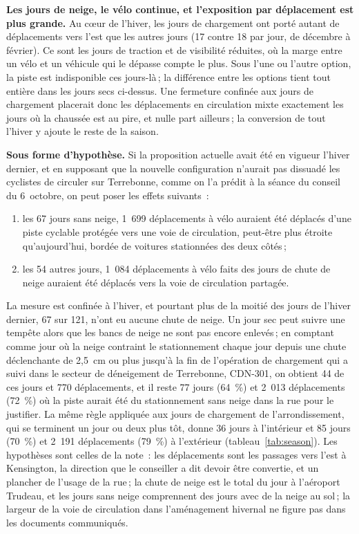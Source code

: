 \documentclass[11pt,letterpaper]{article}
\begin{document}
\textbf{Les jours de neige, le vélo continue, et l'exposition par
déplacement est plus grande.} Au c\oe ur de l'hiver, les jours de chargement
ont porté autant de déplacements vers l'est que les autres jours (17
contre 18 par jour, de décembre à février). Ce sont les jours de traction
et de visibilité réduites, où la marge entre un vélo et un véhicule qui le
dépasse compte le plus. Sous l'une ou l'autre option, la piste est
indisponible ces jours-là\,; la différence entre les options tient tout
entière dans les jours secs ci-dessus. Une fermeture confinée aux jours de
chargement placerait donc les déplacements en circulation mixte exactement
les jours où la chaussée est au pire, et nulle part ailleurs\,; la
conversion de tout l'hiver y ajoute le reste de la saison.

\textbf{Sous forme d'hypothèse.} Si la proposition actuelle avait été en
vigueur l'hiver dernier, et en supposant que la nouvelle configuration
n'aurait pas dissuadé les cyclistes de circuler sur Terrebonne, comme on
l'a prédit à la séance du conseil du 6~octobre, on peut poser les effets
suivants~:
\begin{enumerate}[nosep]
  \item les 67 jours sans neige, 1~699 déplacements à vélo auraient été
    déplacés d'une piste cyclable protégée vers une voie de circulation,
    peut-être plus étroite qu'aujourd'hui, bordée de voitures stationnées
    des deux côtés\,;
  \item les 54 autres jours, 1~084 déplacements à vélo faits des jours de
    chute de neige auraient été déplacés vers la voie de circulation
    partagée.
\end{enumerate}
La mesure est confinée à l'hiver, et pourtant plus de la moitié des jours
de l'hiver dernier, 67 sur 121, n'ont eu aucune chute de neige. Un jour
sec peut suivre une tempête alors que les bancs de neige ne sont pas
encore enlevés\,; en comptant comme jour où la neige contraint le
stationnement chaque jour depuis une chute déclenchante de 2,5~cm ou plus
jusqu'à la fin de l'opération de chargement qui a suivi dans le secteur de
déneigement de Terrebonne, CDN-301, on obtient 44 de ces jours et 770
déplacements, et il reste 77 jours (64~\%) et 2~013 déplacements (72~\%)
où la piste aurait été du stationnement sans neige dans la rue pour le
justifier. La même règle appliquée aux jours de chargement de
l'arrondissement, qui se terminent un jour ou deux plus tôt, donne 36 jours
à l'intérieur et 85 jours (70~\%) et 2~191 déplacements (79~\%) à
l'extérieur (tableau~\ref{tab:season}).
Les hypothèses sont celles de la note~: les déplacements sont les passages
vers l'est à Kensington, la direction que le conseiller a dit devoir être
convertie, et un plancher de l'usage de la rue\,; la chute de neige est le
total du jour à l'aéroport Trudeau, et les jours sans neige comprennent des
jours avec de la neige au sol\,; la largeur de la voie de circulation dans
l'aménagement hivernal ne figure pas dans les documents communiqués.
\end{document}

